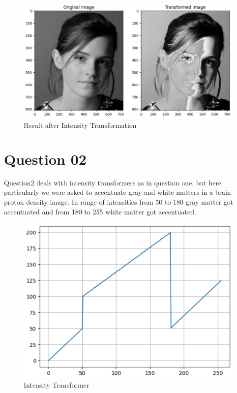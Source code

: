 \documentclass[11pt,a4paper]{article}
\begin{document}
{\begin{figure}[h]
    \centering
    \includegraphics[width=0.9\linewidth]{images/emma.png}
    \caption{Result after Intensity Transformation}
\end{figure}}

\newpage

\section{Question 02}
Question2 deals with intensity transformers as in question one, but here particularly we were asked to accentuate gray and white matters in a brain proton density image. In range of intensities from 50 to 180 gray matter got accentuated and from 180 to 255 white matter got accentuated.

{\begin{figure}[h]
    \centering
    \includegraphics[width=0.8\linewidth]{images/intensity_transformer2.png}
    \caption{Intensity Transformer}
\end{figure}}
\end{document}
